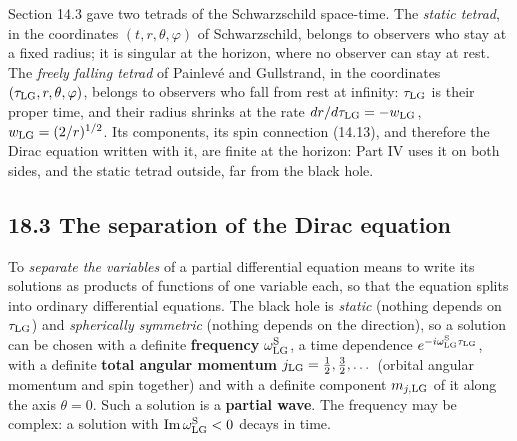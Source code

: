 \documentclass[
  10pt,
]{article}
\begin{document}
Section 14.3 gave two tetrads of the Schwarzschild space-time. The
\emph{static tetrad}, in the coordinates \((t,r,\theta,\varphi)\) of
Schwarzschild, belongs to observers who stay at a fixed radius; it is
singular at the horizon, where no observer can stay at rest. The
\emph{freely falling tetrad} of Painlevé and Gullstrand, in the
coordinates \((\tau_{\rm LG},r,\theta,\varphi)\), belongs to observers
who fall from rest at infinity: \(\tau_{\rm LG}\) is their proper time,
and their radius shrinks at the rate \(dr/d\tau_{\rm LG}=-w_{\rm LG}\),
\(w_{\rm LG}=(2/r)^{1/2}\). Its components, its spin connection (14.13),
and therefore the Dirac equation written with it, are finite at the
horizon: Part IV uses it on both sides, and the static tetrad outside,
far from the black hole.

\hypertarget{the-separation-of-the-dirac-equation}{%
\subsection{18.3 The separation of the Dirac
equation}\label{the-separation-of-the-dirac-equation}}

To \emph{separate the variables} of a partial differential equation
means to write its solutions as products of functions of one variable
each, so that the equation splits into ordinary differential equations.
The black hole is \emph{static} (nothing depends on \(\tau_{\rm LG}\))
and \emph{spherically symmetric} (nothing depends on the direction), so
a solution can be chosen with a definite \textbf{frequency}
\(\omega^{\rm S}_{\rm LG}\), a time dependence
\(e^{-i\omega^{\rm S}_{\rm LG}\tau_{\rm LG}}\), with a definite
\textbf{total angular momentum} \(j_{\rm LG}=\tfrac12,\tfrac32,\dots\)
(orbital angular momentum and spin together) and with a definite
component \(m_{j,{\rm LG}}\) of it along the axis \(\theta=0\). Such a
solution is a \textbf{partial wave}. The frequency may be complex: a
solution with \({\rm Im}\,\omega^{\rm S}_{\rm LG}<0\) decays in time.
\end{document}
